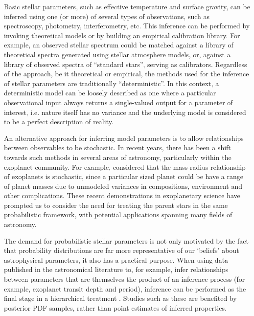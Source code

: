 Basic stellar parameters, such as effective temperature and surface gravity,
can be inferred using one (or more) of several types of observations, such as
spectroscopy, photometry, interferometry, etc. This inference can be performed
by invoking theoretical models or by building an empirical calibration
library.
For example, an observed stellar spectrum could be matched against a library of
theoretical spectra generated using stellar atmosphere models, or, against a
library of observed spectra of ``standard stars'', serving as calibrators.
Regardless of the approach, be it theoretical or empirical, the methods used
for the inference of stellar parameters are traditionally ``deterministic''.
In this context, a deterministic model can be loosely described as one where
a particular observational input always returns a single-valued output for a
parameter of interest, i.e. nature itself has no variance and the underlying
model is considered to be a perfect description of reality.

An alternative approach for inferring model parameters is to allow
relationships between observables to be stochastic.
In recent years, there has been a shift towards such methods in several areas
of astronomy, particularly within the exoplanet community.
For example, \citet{Wolfgang2015} considered that the mass-radius
relationship of exoplanets is stochastic, since a particular sized planet
could be have a range of planet masses due to unmodeled variances in
compositions, environment and other complications.
These recent demonstrations in exoplanetary science have prompted us to
consider the need for treating the parent stars in the same probabilistic
framework, with potential applications spanning many fields of astronomy.

The demand for probabilistic stellar parameters is not only motivated by the
fact that probability distributions are far more representative of our
`beliefs' about astrophysical parameters, it also has a practical purpose.
When using data published in the astronomical literature to, for example,
infer relationships between parameters that are themselves the product of an
inference process (for example, exoplanet transit depth and period), inference
can be performed as the final stage in a hierarchical treatment \citep[see,
e.g.][]{Foreman-Mackey2014}.
Studies such as these are benefited by posterior PDF samples, rather than
point estimates of inferred properties.

